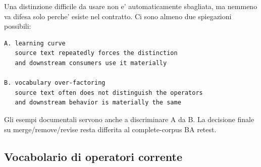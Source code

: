 \documentclass[11pt,a4paper]{article}
\begin{document}
\begin{reviewbox}
Una distinzione difficile da usare non e' automaticamente sbagliata, ma nemmeno va difesa solo perche' esiste nel contratto. Ci sono almeno due spiegazioni possibili:

\begin{lstlisting}
A. learning curve
   source text repeatedly forces the distinction
   and downstream consumers use it materially

B. vocabulary over-factoring
   source text often does not distinguish the operators
   and downstream behavior is materially the same
\end{lstlisting}

Gli esempi documentali servono anche a discriminare A da B. La decisione finale su merge/remove/revise resta differita al complete-corpus BA retest.
\end{reviewbox}

\subsection{Vocabolario di operatori corrente}
\end{document}
